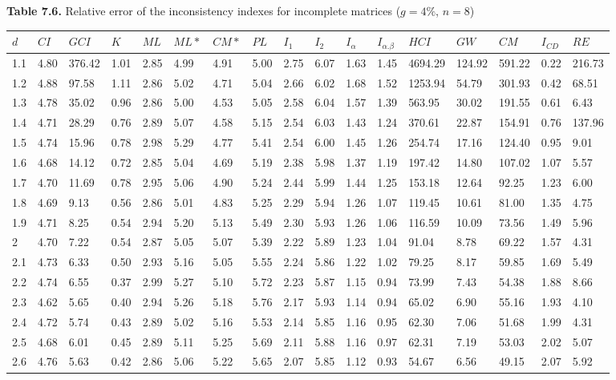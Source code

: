 \newpage
\textbf{Table 7.6.} Relative error of the inconsistency indexes for incomplete matrices ($g=4\%$, $n=8$)
\begin{adjustbox}{angle=90}
  \begin{center}
    \begin{tabular}{|l|llllllllllllllll|}
      \hline $d$ &
$CI$&$	\textit{GCI}$&$K$&$ML$&$ML*$&$CM*$&$PL$&$I_1$&$I_2$&$I_{\alpha}$&$I_{\alpha.\beta}$&$HCI$&$GW$&$CM$&$I_{CD}$&$RE$\\ \hline \hline
1.1&4.80&376.42&1.01&2.85&4.99&4.91&5.00&2.75&6.07&1.63&1.45&4694.29&124.92&591.22&0.22&216.73  \\ 
1.2&4.88&97.58&1.11&2.86&5.02&4.71&5.04&2.66&6.02&1.68&1.52&1253.94&54.79&301.93&0.42&68.51  \\ 
1.3&4.78&35.02&0.96&2.86&5.00&4.53&5.05&2.58&6.04&1.57&1.39&563.95&30.02&191.55&0.61&6.43  \\ 
1.4&4.71&28.29&0.76&2.89&5.07&4.58&5.15&2.54&6.03&1.43&1.24&370.61&22.87&154.91&0.76&137.96  \\ 
1.5&4.74&15.96&0.78&2.98&5.29&4.77&5.41&2.54&6.00&1.45&1.26&254.74&17.16&124.40&0.95&9.01  \\ 
1.6&4.68&14.12&0.72&2.85&5.04&4.69&5.19&2.38&5.98&1.37&1.19&197.42&14.80&107.02&1.07&5.57  \\ 
1.7&4.70&11.69&0.78&2.95&5.06&4.90&5.24&2.44&5.99&1.44&1.25&153.18&12.64&92.25&1.23&6.00  \\ 
1.8&4.69&9.13&0.56&2.86&5.01&4.83&5.25&2.29&5.94&1.26&1.07&119.45&10.61&81.00&1.35&4.75  \\ 
1.9&4.71&8.25&0.54&2.94&5.20&5.13&5.49&2.30&5.93&1.26&1.06&116.59&10.09&73.56&1.49&5.96  \\ 
2&4.70&7.22&0.54&2.87&5.05&5.07&5.39&2.22&5.89&1.23&1.04&91.04&8.78&69.22&1.57&4.31  \\ 
2.1&4.73&6.33&0.50&2.93&5.16&5.05&5.55&2.24&5.86&1.22&1.02&79.25&8.17&59.85&1.69&5.49  \\ 
2.2&4.74&6.55&0.37&2.99&5.27&5.10&5.72&2.23&5.87&1.15&0.94&73.99&7.43&54.38&1.88&8.66  \\ 
2.3&4.62&5.65&0.40&2.94&5.26&5.18&5.76&2.17&5.93&1.14&0.94&65.02&6.90&55.16&1.93&4.10  \\ 
2.4&4.72&5.74&0.43&2.89&5.02&5.16&5.53&2.14&5.85&1.16&0.95&62.30&7.06&51.68&1.99&4.31  \\ 
2.5&4.68&6.01&0.45&2.89&5.11&5.25&5.69&2.11&5.88&1.16&0.97&62.31&7.19&53.03&2.02&5.07  \\ 
2.6&4.76&5.63&0.42&2.86&5.06&5.22&5.65&2.07&5.85&1.12&0.93&54.67&6.56&49.15&2.07&5.92  \\ 

\end{tabular}
\end{center}
\end{adjustbox}
